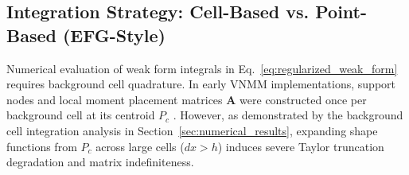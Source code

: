 \documentclass[preprint,12pt]{elsarticle}
\begin{document}
\subsection{Integration Strategy: Cell-Based vs. Point-Based (EFG-Style)}
\label{subsec:integration_strategy}

Numerical evaluation of weak form integrals in Eq.~\eqref{eq:regularized_weak_form} requires background cell quadrature. In early VNMM implementations, support nodes and local moment placement matrices $\mathbf{A}$ were constructed once per background cell at its centroid $P_c$ \cite{ortiz2021nodal, ortiz2023tese}. However, as demonstrated by the background cell integration analysis in Section~\ref{sec:numerical_results}, expanding shape functions from $P_c$ across large cells ($dx > h$) induces severe Taylor truncation degradation and matrix indefiniteness.
\end{document}

